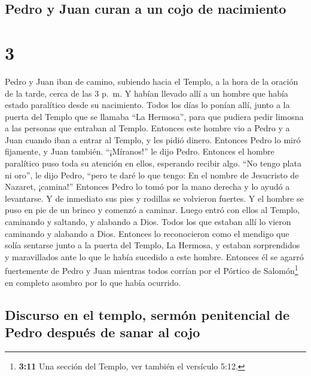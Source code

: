 \hypertarget{pedro-y-juan-curan-a-un-cojo-de-nacimiento}{%
\subsection{Pedro y Juan curan a un cojo de
nacimiento}\label{pedro-y-juan-curan-a-un-cojo-de-nacimiento}}

\hypertarget{section-2}{%
\section{3}\label{section-2}}

 Pedro y Juan iban de camino, subiendo hacia el Templo, a
la hora de la oración de la tarde, cerca de las 3 p.~m.  Y
habían llevado allí a un hombre que había estado paralítico desde su
nacimiento. Todos los días lo ponían allí, junto a la puerta del Templo
que se llamaba ``La Hermosa'', para que pudiera pedir limosna a las
personas que entraban al Templo.  Entonces este hombre vio
a Pedro y a Juan cuando iban a entrar al Templo, y les pidió dinero.
 Entonces Pedro lo miró fijamente, y Juan también.
``¡Míranos!'' le dijo Pedro.  Entonces el hombre
paralítico puso toda su atención en ellos, esperando recibir algo.
 ``No tengo plata ni oro'', le dijo Pedro, ``pero te daré
lo que tengo: En el nombre de Jesucristo de Nazaret, ¡camina!''
 Entonces Pedro lo tomó por la mano derecha y lo ayudó a
levantarse. Y de inmediato sus pies y rodillas se volvieron fuertes.
 Y el hombre se puso en pie de un brinco y comenzó a
caminar. Luego entró con ellos al Templo, caminando y saltando, y
alabando a Dios.  Todos los que estaban allí lo vieron
caminando y alabando a Dios.  Entonces lo reconocieron
como el mendigo que solía sentarse junto a la puerta del Templo, La
Hermosa, y estaban sorprendidos y maravillados ante lo que le había
sucedido a este hombre.  Entonces él se agarró
fuertemente de Pedro y Juan mientras todos corrían por el Pórtico de
Salomón\footnote{\textbf{3:11} Una sección del Templo, ver también el
  versículo 5:12.} en completo asombro por lo que había ocurrido.

\hypertarget{discurso-en-el-templo-sermuxf3n-penitencial-de-pedro-despuuxe9s-de-sanar-al-cojo}{%
\subsection{Discurso en el templo, sermón penitencial de Pedro después
de sanar al
cojo}\label{discurso-en-el-templo-sermuxf3n-penitencial-de-pedro-despuuxe9s-de-sanar-al-cojo}}

